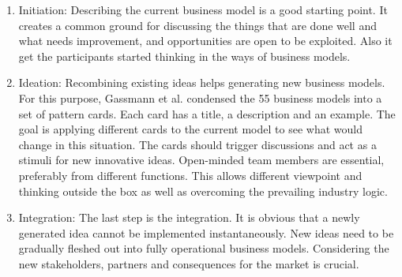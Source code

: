 		\begin{enumerate}
			\item Initiation: Describing the current business model is a good starting point. It creates a common ground for discussing the things that are done well and what needs improvement, and opportunities are open to be exploited. Also it get the participants started thinking in the ways of business models.
			\item Ideation: Recombining existing ideas helps generating new business models. For this purpose, Gassmann et al. condensed the 55 business models into a set of pattern cards. Each card has a title, a description and an example. The goal is applying different cards to the current model to see what would change in this situation. The cards should trigger discussions and act as a stimuli for new innovative ideas. Open-minded team members are essential, preferably from different functions. This allows different viewpoint and thinking outside the box as well as overcoming the prevailing industry logic.
			\item Integration: The last step is the integration. It is obvious that a newly generated idea cannot be implemented instantaneously. New ideas need to be gradually fleshed out into fully operational business models. Considering the new stakeholders, partners and consequences for the market is crucial.
		\end{enumerate}
		

	\vspace{-1em}
